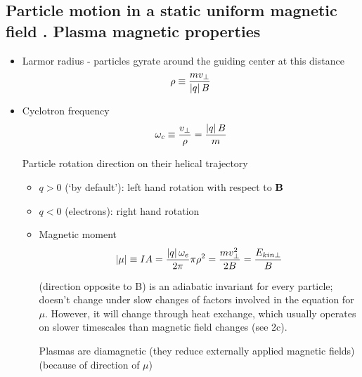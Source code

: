 	\subsection{Particle motion in a static uniform magnetic field . Plasma magnetic properties} 
		\begin{itemize}
			\item Larmor radius - particles gyrate around the guiding center at this distance
			\[\rho \equiv \frac{m v_{\perp}}{\left| q \right| B}\]
			\item Cyclotron frequency
			\[\omega_c \equiv \frac{v_{\perp}}{\rho} = \frac{\left| q \right| B}{m}\]
			
			Particle rotation direction on their helical trajectory
			\begin{itemize}
			\item $q>0$ (`by default'): left hand rotation with respect to $\mathbf{B}$
			\item $q<0$ (electrons): right hand rotation
			
			\item Magnetic moment
			\[\left| \mathbf{\mu} \right| \equiv I A = \frac{\left| q \right|\omega_e}{2\pi} \pi \rho^2 = \frac{m v_{\perp}^2}{2 B} = \frac{E_{kin \perp}}{B}\]
			
			(direction opposite to B)
			is an adiabatic invariant for every particle; doesn't change under slow changes of factors involved in the equation for $\mu$. However, it will change through heat exchange, which usually operates on slower timescales than magnetic field changes (see 2c).
			
			Plasmas are diamagnetic (they reduce externally applied magnetic fields) (because of direction of $\mu$)
			\end{itemize}
		\end{itemize}


